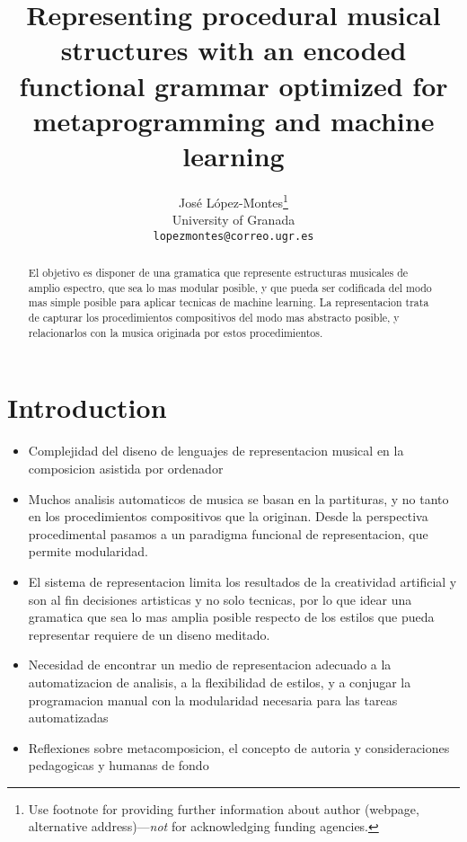 \documentclass{article}
\title{Representing procedural musical structures with an encoded functional grammar optimized for metaprogramming and machine learning}
\author{
  Jos\'e L\'opez-Montes\thanks{Use footnote for providing further
    information about author (webpage, alternative
    address)---\emph{not} for acknowledging funding agencies.} \\
  University of Granada\\
  \texttt{lopezmontes@correo.ugr.es} \\
}
\begin{document}
\maketitle


\begin{abstract}
El objetivo es disponer de una gramatica que represente estructuras musicales de amplio espectro, que sea lo mas modular posible, y que pueda ser codificada del modo mas simple posible para aplicar tecnicas de machine learning. La representacion trata de capturar los procedimientos compositivos del modo mas abstracto posible, y relacionarlos con la musica originada por estos procedimientos.
\end{abstract}






\section{Introduction}


\begin{itemize}
\item Complejidad del diseno de lenguajes de representacion musical en la composicion asistida por ordenador

\item Muchos analisis automaticos de musica se basan en la partituras, y no tanto en los procedimientos compositivos que la originan.
Desde la perspectiva procedimental pasamos a un paradigma funcional de representacion, que permite modularidad.

\item El sistema de representacion limita los resultados de la creatividad artificial y son al fin decisiones artisticas y no solo tecnicas, por lo que idear una gramatica que sea lo mas amplia posible respecto de los estilos que pueda representar requiere de un diseno meditado.

\item Necesidad de encontrar un medio de representacion adecuado a la automatizacion de analisis, a la flexibilidad de estilos, y a conjugar la programacion manual con la modularidad necesaria para las tareas automatizadas

\item Reflexiones sobre metacomposicion, el concepto de autoria y consideraciones pedagogicas y humanas de fondo

\end{itemize}
\end{document}
